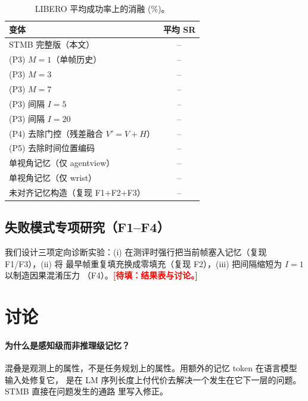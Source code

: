 \documentclass[11pt]{ctexart}
\newcommand{\todo}[1]{\textcolor{red}{\textbf{[待填：#1]}}}
\newcommand{\num}{--}
\begin{document}
\begin{table}[h]
\centering
\caption{LIBERO 平均成功率上的消融 (\%)。}
\label{tab:ablations}
\small
\begin{tabular}{lc}
\toprule
变体 & 平均 SR \\
\midrule
STMB 完整版（本文）                                                 & \num \\
(P3) $M{=}1$（单帧历史）                                             & \num \\
(P3) $M{=}3$                                                         & \num \\
(P3) $M{=}7$                                                         & \num \\
(P3) 间隔 $I{=}5$                                                    & \num \\
(P3) 间隔 $I{=}20$                                                   & \num \\
(P4) 去除门控（残差融合 $V' = V + H$）                               & \num \\
(P5) 去除时间位置编码                                                & \num \\
单视角记忆（仅 agentview）                                           & \num \\
单视角记忆（仅 wrist）                                               & \num \\
未对齐记忆构造（复现 F1+F2+F3）                                      & \num \\
\bottomrule
\end{tabular}
\end{table}

\subsection{失败模式专项研究（F1–F4）}

我们设计三项定向诊断实验：(i) 在测评时强行把当前帧塞入记忆（复现 F1/F3），(ii) 将
最早帧重复填充换成零填充（复现 F2），(iii) 把间隔缩短为 $I{=}1$ 以制造因果混淆压力
（F4）。\todo{结果表与讨论。}

\section{讨论}
\label{sec:discussion}

\paragraph{为什么是感知级而非推理级记忆？}
混叠是观测上的属性，不是任务规划上的属性。用额外的记忆 token 在语言模型输入处修复它，
是在 LM 序列长度上付代价去解决一个发生在它下一层的问题。STMB 直接在问题发生的通路
里写入修正。
\end{document}
